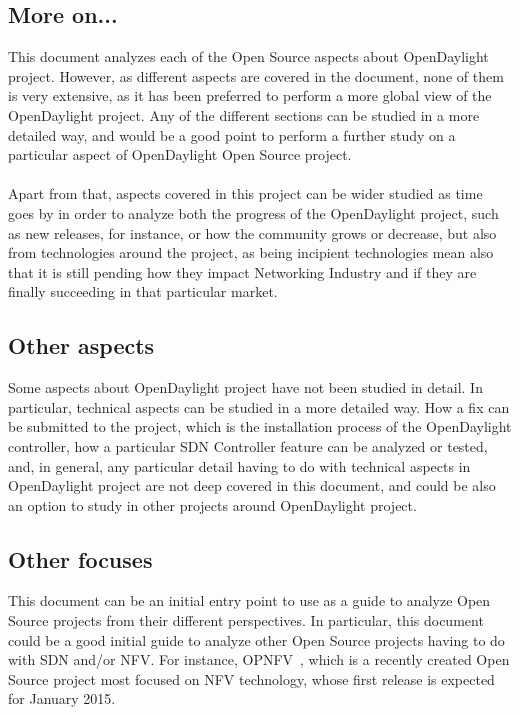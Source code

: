\documentclass[a4paper, 12pt]{book}
\begin{document}
\subsection{More on...}

This document analyzes each of the Open Source aspects about OpenDaylight project. However, as different aspects are covered in the document, none of them is very extensive, as it has been preferred to perform a more global view of the OpenDaylight project. Any of the different sections can be studied in a more detailed way, and would be a good point to perform a further study on a particular aspect of OpenDaylight Open Source project.\\
\\
Apart from that, aspects covered in this project can be wider studied as time goes by in order to analyze both the progress of the OpenDaylight project, such as new releases, for instance, or how the community grows or decrease, but also from technologies around the project, as being incipient technologies mean also that it is still pending how they impact Networking Industry and if they are finally succeeding in that particular market.

\subsection{Other aspects}

Some aspects about OpenDaylight project have not been studied in detail. In particular, technical aspects can be studied in a more detailed way. How a fix can be submitted to the project, which is the installation process of the OpenDaylight controller, how a particular SDN Controller feature can be analyzed or tested, and, in general, any particular detail having to do with technical aspects in OpenDaylight project are not deep covered in this document, and could be also an option to study in other projects around OpenDaylight project.

\subsection{Other focuses}

This document can be an initial entry point to use as a guide to analyze Open Source projects from their different perspectives. In particular, this document could be a good initial guide to analyze other Open Source projects having to do with SDN and/or NFV. For instance, OPNFV~\cite{OPNFV}, which is a recently created Open Source project most focused on NFV technology, whose first release is expected for January 2015.
\end{document}
